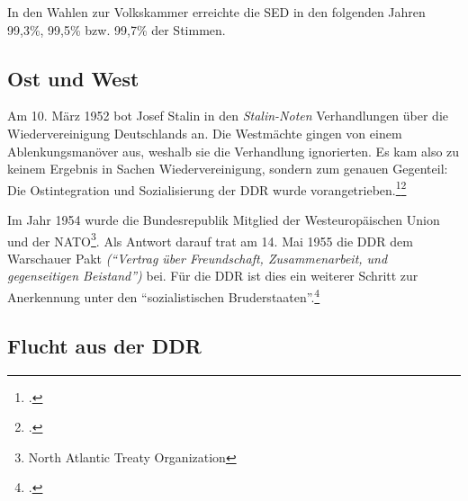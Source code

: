 \documentclass[12pt,a4paper]{article}
\begin{document}
In den Wahlen zur Volkskammer erreichte die SED in den folgenden Jahren 99,3\%, 99,5\% bzw. 99,7\% der Stimmen.


\subsection{Ost und West}
\label{anfaenge:ost-west}

Am 10. März 1952 bot Josef Stalin in den \textit{Stalin-Noten} Verhandlungen über die Wiedervereinigung Deutschlands an. Die Westmächte gingen von einem Ablenkungsmanöver aus, weshalb sie die Verhandlung ignorierten. Es kam also zu keinem Ergebnis in Sachen Wiedervereinigung, sondern zum genauen Gegenteil: Die Ostintegration und Sozialisierung der DDR wurde vorangetrieben.\footcite{stalinnoten}\footcite{wiki:geschddr}

Im Jahr 1954 wurde die Bundesrepublik Mitglied der Westeuropäischen Union und der NATO\footnote{North Atlantic Treaty Organization}. Als Antwort darauf trat am 14. Mai 1955 die DDR dem Warschauer Pakt \textit{(\enquote{Vertrag über Freundschaft, Zusammenarbeit, und gegenseitigen Beistand})} bei. Für die DDR ist dies ein weiterer Schritt zur Anerkennung unter den \enquote{sozialistischen Bruderstaaten}.\footcite{warschauer-pakt}


\subsection{Flucht aus der DDR}
\label{flucht}
\end{document}
